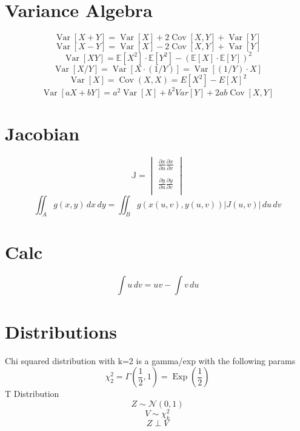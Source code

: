 \documentclass[twocolumn]{amsart}
\newcommand{\E}{\mathbb{E}}
\newcommand{\Cov}{\operatorname{Cov}}
\newcommand{\Var}{\operatorname{Var}}
\newcommand{\Exp}{\operatorname{Exp}}
\begin{document}
\section*{Variance Algebra}
\begin{equation*}
  \Var[X + Y] = \Var[X] + 2\Cov[X, Y] + \Var[Y]
\end{equation*}
\begin{equation*}
  \Var[X - Y] = \Var[X] - 2\Cov[X, Y] + \Var[Y]
\end{equation*}
\begin{equation*}
  \Var[XY] = \E[X^2] \cdot \E[Y^2] - {(\E[X] \cdot \E[Y])}^2
\end{equation*}
\begin{equation*}
  \Var[X/Y] = \Var[X \cdot (1/Y)] = \Var[(1/Y) \cdot X]
\end{equation*}
\begin{equation*}
  \Var[X] = \Cov(X, X) = E[X^2] - {E[X]}^2
\end{equation*}
\begin{equation*}
  \Var[aX+bY] = a^2\Var[X] + b^2 Var[Y] + 2ab\Cov[X,Y]
\end{equation*}

\section*{Jacobian}
\begin{equation*}
\mathbb{J}=\begin{vmatrix}
\frac{\partial x}{\partial u}\frac{\partial x}{\partial v} \\
\\
\frac{\partial y}{\partial u}\frac{\partial y}{\partial v} \\
\end{vmatrix}
\end{equation*}
\begin{equation*}
  \iint_{A}g(x,y)\,dx\,dy = \iint_{B}g(x(u,v),y(u,v))|J(u,v)|\,du\,dv
\end{equation*}

\section*{Calc}
\begin{equation*}
  \int u\,dv = uv-\int v\,du
\end{equation*}

\section*{Distributions}
Chi squared distribution with k=2 is a gamma/exp with the following params
\begin{equation*}
  \chi_{2}^{2} = \Gamma(\frac{1}{2},1) = \Exp(\frac{1}{2})
\end{equation*}
T Distribution
\begin{equation*}
  Z \sim \mathcal{N}(0, 1)
\end{equation*}
\begin{equation*}
  V \sim \chi_{k}^{2}
\end{equation*}
\begin{equation*}
  Z \perp V
\end{equation*}
\end{document}
